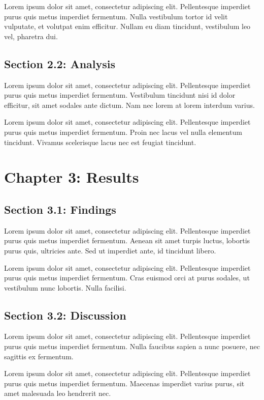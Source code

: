 \documentclass[a4paper, 12pt]{article}
\begin{document}
Lorem ipsum dolor sit amet, consectetur adipiscing elit. Pellentesque imperdiet purus quis metus imperdiet fermentum. Nulla vestibulum tortor id velit vulputate, et volutpat enim efficitur. Nullam eu diam tincidunt, vestibulum leo vel, pharetra dui.

\subsection{Section 2.2: Analysis}
Lorem ipsum dolor sit amet, consectetur adipiscing elit. Pellentesque imperdiet purus quis metus imperdiet fermentum. Vestibulum tincidunt nisi id dolor efficitur, sit amet sodales ante dictum. Nam nec lorem at lorem interdum varius.

Lorem ipsum dolor sit amet, consectetur adipiscing elit. Pellentesque imperdiet purus quis metus imperdiet fermentum. Proin nec lacus vel nulla elementum tincidunt. Vivamus scelerisque lacus nec est feugiat tincidunt.

\newpage

\section{Chapter 3: Results}
\subsection{Section 3.1: Findings}
Lorem ipsum dolor sit amet, consectetur adipiscing elit. Pellentesque imperdiet purus quis metus imperdiet fermentum. Aenean sit amet turpis luctus, lobortis purus quis, ultricies ante. Sed ut imperdiet ante, id tincidunt libero.

Lorem ipsum dolor sit amet, consectetur adipiscing elit. Pellentesque imperdiet purus quis metus imperdiet fermentum. Cras euismod orci at purus sodales, ut vestibulum nunc lobortis. Nulla facilisi.

\subsection{Section 3.2: Discussion}
Lorem ipsum dolor sit amet, consectetur adipiscing elit. Pellentesque imperdiet purus quis metus imperdiet fermentum. Nulla faucibus sapien a nunc posuere, nec sagittis ex fermentum.

Lorem ipsum dolor sit amet, consectetur adipiscing elit. Pellentesque imperdiet purus quis metus imperdiet fermentum. Maecenas imperdiet varius purus, sit amet malesuada leo hendrerit nec.
\end{document}
